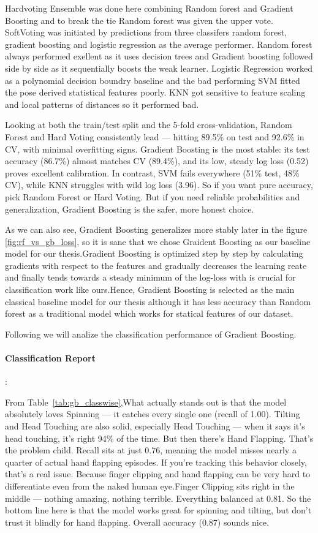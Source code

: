 Hardvoting Ensemble was done here combining Random forest and Gradient Boosting and to break the tie Random forest was given the upper vote. SoftVoting was initiated by predictions from three classifers random forest, gradient boosting and logistic regression as the average performer. Random forest always performed exellent as it uses decision trees and Gradient boosting followed side by side as it sequentially boosts the weak learner. Logistic Regression worked as a polynomial decision boundry baseline and the bad performing SVM fitted the pose derived statistical features poorly. KNN got sensitive to feature scaling and local patterns of distances so it performed bad.

Looking at both the train/test split and the 5-fold cross-validation, Random Forest and Hard Voting consistently lead — hitting 89.5\% on test and 92.6\% in CV, with minimal overfitting signs. Gradient Boosting is the most stable: its test accuracy (86.7\%) almost matches CV (89.4\%), and its low, steady log loss (0.52) proves excellent calibration. In contrast, SVM fails everywhere (51\% test, 48\% CV), while KNN struggles with wild log loss (3.96). So if you want pure accuracy, pick Random Forest or Hard Voting. But if you need reliable probabilities and generalization, Gradient Boosting is the safer, more honest choice.


As we can also see, Gradient Boosting generalizes more stably later in the figure \ref{fig:rf_vs_gb_loss}, so it is sane that we chose Graident Boosting as our baseline model for our thesis.Gradient Boosting is optimized step by step by calculating gradients with respect to the features and gradually decreases the learning reate and finally tends towards a steady minimum of the log-loss with is crucial for classification work like ours.Hence, Gradient Boosting is selected as the main classical baseline model for our thesis although it has less accuracy than Random forest as a traditional model which works for statical features of our dataset.

Following we will analize the classification performance of Gradient Boosting.


\paragraph{Classification Report} : 

From Table~\ref{tab:gb_classwise},What actually stands out is that the model absolutely loves Spinning — it catches every single one (recall of 1.00). Tilting and Head Touching are also solid, especially Head Touching — when it says it's head touching, it's right 94\% of the time. But then there's Hand Flapping. That's the problem child. Recall sits at just 0.76, meaning the model misses nearly a quarter of actual hand flapping episodes. If you're tracking this behavior closely, that's a real issue. Because finger clipping and hand flapping can be very hard to differentiate even from the naked human eye.Finger Clipping sits right in the middle — nothing amazing, nothing terrible. Everything balanced at 0.81.
So the bottom line here is that the model works great for spinning and tilting, but don't trust it blindly for hand flapping. Overall accuracy (0.87) sounds nice.


